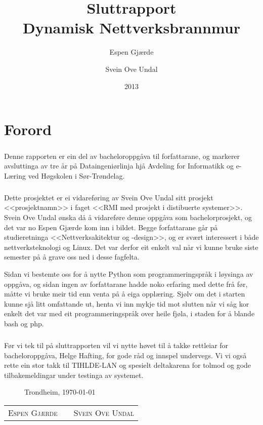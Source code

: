 \documentclass[nynorsk,12pt,a4paper,oneside]{book}
\title{Sluttrapport \\ Dynamisk Nettverksbrannmur}
\author{Espen Gjærde \and Svein Ove Undal}
\date{2013}
\begin{document}

\frontmatter
\maketitle
\chapter{Forord}
\paragraph*{}
Denne rapporten er ein del av bacheloroppgåva til forfattarane, og markerer avsluttinga av tre år på Dataingeniørlinja hjå Avdeling for Informatikk og e-Læring ved Høgskolen i Sør-Trøndelag. 
\paragraph*{}
Dette prosjektet er ei vidareføring av Svein Ove Undal sitt prosjekt <<prosjektnamn>> i faget <<RMI med prosjekt i distibuerte systemer>>. Svein Ove Undal ønska då å vidareføre denne oppgåva som bachelorprosjekt, og det var no Espen Gjærde kom inn i bildet. Begge forfattarane går på studieretninga <<Nettverksakitektur og -design>>, og er svært interessert i både nettverksteknologi og Linux. Det var derfor eit enkelt val når vi kunne bruke siste semester på å grave oss ned i desse fagfelta. 

Sidan vi bestemte oss for å nytte Python som programmeringspråk i løysinga av oppgåva, og sidan ingen av forfattarane hadde noko erfaring med dette frå før, måtte vi bruke meir tid enn venta på å eiga opplæring. Sjølv om det i starten kunne sjå litt omfattande ut, henta vi inn mykje tid mot slutten når vi såg kor enkelt det var med eit programmeringspråk over heile fjøla, i staden for å blande bash og php. 

\paragraph*{}
Før vi tek til på sluttrapporten vil vi nytte høvet til å takke rettleiar for bacheloroppgåva, Helge Hafting, for gode råd og innspel undervegs. Vi vi også rette ein stor takk til TIHLDE-LAN og spesielt deltakarena for tolmod og gode tilbakemeldingar under testinga av systemet. 
 
\begin{figure}[b]
Trondheim, \today \\
\vspace{1cm}
\end{figure}
\begin{table}[b!]
	\centering
	\begin{tabular}[c]{ c p{4cm} c } 
		\cline{1-1} \cline{3-3}
		\parbox{5cm}{\centering \textsc{Espen Gjærde}}
		& & 
		\parbox{5cm}{\centering \textsc{Svein Ove Undal}} \\
	\end{tabular}
\end{table}
\end{document}

